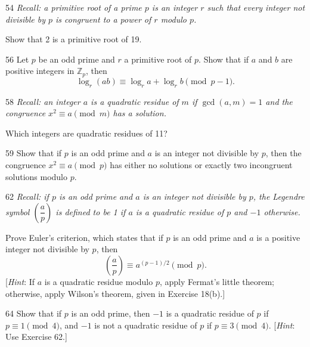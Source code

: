 \documentclass[11pt]{article}
\begin{document}
\begin{exercise}{54}
    \textit{Recall: a primitive root of a prime $p$ is an integer
    $r$ such that every integer not divisible by $p$ is congruent to
    a power of $r$ modulo $p$.}

    Show that 2 is a primitive root of 19.
\end{exercise}

\begin{exercise}{56}
    Let $p$ be an odd prime and $r$ a primitive root of $p$. Show
    that if $a$ and $b$ are positive integers in $\mathbb{Z}_p$, then
    \[
    \log_r(ab) \equiv \log_r a + \log_r b \pmod{p-1}.
    \]
\end{exercise}

\begin{exercise}{58}
    \textit{Recall: an integer $a$ is a \emph{quadratic residue} of
    $m$ if $\gcd(a,m) = 1$ and the congruence $x^2 \equiv a
    \pmod{m}$ has a solution.}

    Which integers are quadratic residues of 11?
\end{exercise}

\begin{exercise}{59}
    Show that if $p$ is an odd prime and $a$ is an integer not
    divisible by $p$, then the congruence $x^2 \equiv a \pmod{p}$
    has either no solutions or exactly two incongruent solutions
    modulo $p$.
\end{exercise}

\begin{exercise}{62}
    \textit{Recall: if $p$ is an odd prime and $a$ is an integer not
    divisible by $p$, the Legendre symbol $\left(\dfrac{a}{p}\right)$
    is defined to be 1 if $a$ is a quadratic residue of $p$ and
    $-1$ otherwise.}

    Prove Euler's criterion, which states that if $p$ is an odd
    prime and $a$ is a positive integer not divisible by $p$, then
    \[
    \left(\frac{a}{p}\right) \equiv a^{(p-1)/2} \pmod{p}.
    \]
    [\emph{Hint}: If $a$ is a quadratic residue modulo $p$, apply
    Fermat's little theorem; otherwise, apply Wilson's theorem,
    given in Exercise 18(b).]
\end{exercise}

\begin{exercise}{64}
    Show that if $p$ is an odd prime, then $-1$ is a quadratic
    residue of $p$ if $p \equiv 1 \pmod{4}$, and $-1$ is not a
    quadratic residue of $p$ if $p \equiv 3 \pmod{4}$.
    [\emph{Hint}: Use Exercise 62.]
\end{exercise}
\end{document}
